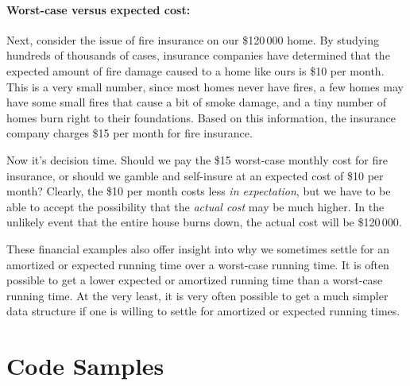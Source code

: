 \paragraph{Worst-case versus expected cost:}
 Next, consider the issue of fire insurance on our \$120\,000 home.  By studying hundreds of thousands of cases, insurance companies have determined that the expected amount of fire damage caused to a home like ours is \$10 per month.  This is a very small number, since most homes never have fires, a few homes may have some small fires that cause a bit of smoke damage, and a tiny number of homes burn right to their foundations.  Based on this information, the insurance company charges \$15 per month for fire insurance.

Now it's decision time. Should we pay the \$15 worst-case monthly cost for fire insurance, or should we gamble and self-insure at an expected cost of \$10 per month?  Clearly, the \$10 per month costs less \emph{in expectation}, but we have to be able to accept the possibility that the \emph{actual cost} may be much higher.  In the unlikely event that the entire house burns down, the actual cost will be \$120\,000.

These financial examples also offer insight into why we sometimes settle for an amortized or expected running time over a worst-case running time.  It is often possible to get a lower expected or amortized running time than a worst-case running time. At the very least, it is very often possible to get a much simpler data structure if one is willing to settle for amortized or expected running times.

\section{Code Samples}

